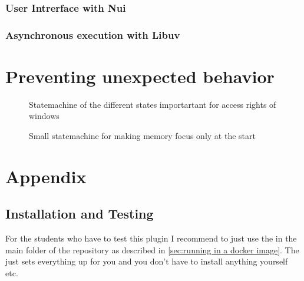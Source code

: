 \documentclass{report}
\begin{document}
\subsection{User Intrerface with Nui}

\subsection{Asynchronous execution with Libuv}
\label{sec:asynchronous execution with libuv}

\chapter{Preventing unexpected behavior}

\begin{figure}
	\centering
	\caption{Statemachine of the different states importartant for access rights of windows}
	\label{fig:statemachine}
\end{figure}

\lipsum

\begin{figure}
	\centering
  \caption{Small statemachine for making memory focus only at the start}
	\label{fig:statemachine focus}
\end{figure}

\lipsum

\clearpage
\chapter{Appendix}

\section{Installation and Testing}

For the students who have to test this plugin I recommend to just use the  in the main folder of the repository as described in \ref{sec:running in a docker image}. The  just sets everything up for you and you don't have to install anything yourself etc.
\end{document}
